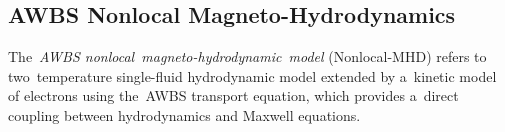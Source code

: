 \begin{comment} %
\begin{eqnarray} 
  \E &=&  
  \frac{\nabla p_e - \vect{R}_{\Te}}{\qe \ed}
  +~~~~~~~~ 
  \frac{\vect{j}}{\sigma} 
  ~~~~~~-~~~~~~ 
  \frac{\vect{j}\vect{\times}\B}{\qe\ed c} 
  ,
  \nonumber \\
  \frac{\qe}{\me}\E 
  &=& 
  \frac{\int \vmag^2 \nabla \fzero~\dI \tilde{\vmag}}
  {\int \vmag \pdv{\fzero}{\vmag}~\dI \tilde{\vmag}}
  +  
  \frac{\int \vmag \nuei\fone~\dI \tilde{\vmag}}
  {\int \vmag \pdv{\fzero}{\vmag}~\dI \tilde{\vmag}} 
  + 
  \frac{\qe\int \vmag \fone\vect{\times}\B~\dI \tilde{\vmag}}
  {\me c \int \vmag \pdv{\fzero}{\vmag}~\dI \tilde{\vmag}} 
  .
  \nonumber
\end{eqnarray}
\end{comment} %

\subsection{AWBS Nonlocal Magneto-Hydrodynamics}
\label{sec:ANTH}
The~\textit{AWBS nonlocal~magneto-hydrodynamic~model} (Nonlocal-MHD)
refers to two~temperature single-fluid hydrodynamic model 
extended by a~kinetic model of electrons using the~AWBS transport equation,
which provides a~direct coupling between hydrodynamics and Maxwell equations.

